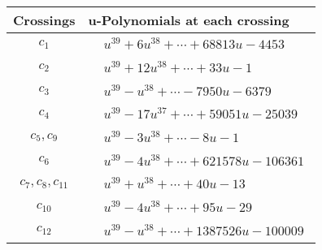 \documentclass[1p]{elsarticle_modified}
\theoremstyle{definition}
\begin{document}
\begin{tabular}{m{50pt}|m{274pt}}
Crossings & \hspace{64pt}u-Polynomials at each crossing \\
\hline $$\begin{aligned}c_{1}\end{aligned}$$&$\begin{aligned}
&u^{39}+6 u^{38}+\cdots+68813 u-4453
\end{aligned}$\\
\hline $$\begin{aligned}c_{2}\end{aligned}$$&$\begin{aligned}
&u^{39}+12 u^{38}+\cdots+33 u-1
\end{aligned}$\\
\hline $$\begin{aligned}c_{3}\end{aligned}$$&$\begin{aligned}
&u^{39}- u^{38}+\cdots-7950 u-6379
\end{aligned}$\\
\hline $$\begin{aligned}c_{4}\end{aligned}$$&$\begin{aligned}
&u^{39}-17 u^{37}+\cdots+59051 u-25039
\end{aligned}$\\
\hline $$\begin{aligned}c_{5},c_{9}\end{aligned}$$&$\begin{aligned}
&u^{39}-3 u^{38}+\cdots-8 u-1
\end{aligned}$\\
\hline $$\begin{aligned}c_{6}\end{aligned}$$&$\begin{aligned}
&u^{39}-4 u^{38}+\cdots+621578 u-106361
\end{aligned}$\\
\hline $$\begin{aligned}c_{7},c_{8},c_{11}\end{aligned}$$&$\begin{aligned}
&u^{39}+u^{38}+\cdots+40 u-13
\end{aligned}$\\
\hline $$\begin{aligned}c_{10}\end{aligned}$$&$\begin{aligned}
&u^{39}-4 u^{38}+\cdots+95 u-29
\end{aligned}$\\
\hline $$\begin{aligned}c_{12}\end{aligned}$$&$\begin{aligned}
&u^{39}- u^{38}+\cdots+1387526 u-100009
\end{aligned}$\\
\hline
\end{tabular}\\~\\
\end{document}
